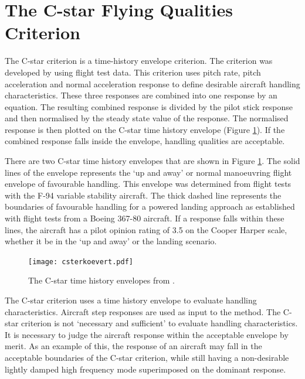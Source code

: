 \documentclass{report}
\begin{document}
\section{The C-star Flying Qualities Criterion}\label{Sec: C-star}


The C-star criterion \citep{CstarCriterion} is a time-history envelope criterion.  The criterion was developed by using flight test data.  This criterion uses pitch rate, pitch acceleration and normal acceleration response to define desirable aircraft handling characteristics.  These three responses are combined into one response by an equation.  The resulting combined response is divided by the pilot stick response and then normalised by the steady state value of the response.  The normalised response is then plotted on the C-star time history envelope (Figure \ref{Fig: CstarTimeHistoryEnvelopes}).  If the combined response falls inside the envelope, handling qualities are acceptable.

There are two C-star time history envelopes that are shown in Figure \ref{Fig: CstarTimeHistoryEnvelopes}.  The solid lines of the envelope represents the `up and away' or normal manoeuvring flight envelope of favourable handling.  This envelope was determined from flight tests with the F-94  variable stability aircraft.   The thick dashed line represents the boundaries of favourable handling for a powered landing approach as established with flight tests from a Boeing 367-80 aircraft.  If a response falls within these lines, the aircraft has a pilot opinion rating of 3.5 on the Cooper Harper scale, whether it be in the `up and away' or the landing scenario.

\begin{figure}[htb]
	\begin{center}
		\texttt{[image: csterkoevert.pdf]}
	\end{center}
	\caption{The C-star time history envelopes from \cite{CstarCriterion}.}
	\label{Fig: CstarTimeHistoryEnvelopes}
\end{figure}

The C-star criterion uses a time history envelope to evaluate handling characteristics.  Aircraft step responses are used as input to the method.  The C-star criterion is not `necessary and sufficient' to evaluate handling characteristics.  It is necessary to judge the aircraft response within the acceptable envelope by merit.  As an example of this, the response of an aircraft may fall in the acceptable boundaries of the C-star criterion, while still having a non-desirable lightly damped high frequency mode superimposed on the dominant response.
\end{document}

